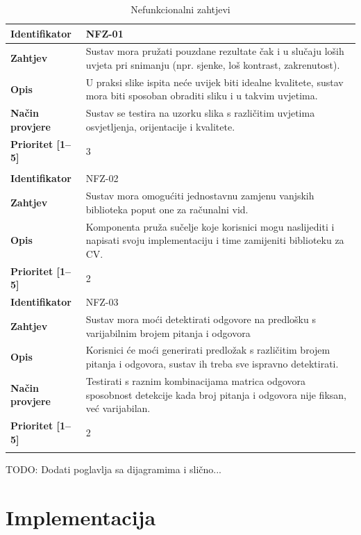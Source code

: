 \documentclass{foi}
\begin{document}
\begin{longtable}{|l|p{12cm}|}
    \hline
    \textbf{Identifikator} & NFZ-01 \\ \hline
    \textbf{Zahtjev} & Sustav mora pružati pouzdane rezultate čak i u slučaju loših uvjeta pri snimanju (npr. sjenke, loš kontrast, zakrenutost). \\ \hline
    \textbf{Opis} & U praksi slike ispita neće uvijek biti idealne kvalitete, sustav mora biti sposoban obraditi sliku i u takvim uvjetima. \\ \hline
    \textbf{Način provjere} & Sustav se testira na uzorku slika s različitim uvjetima osvjetljenja, orijentacije i kvalitete. \\ \hline
    \textbf{Prioritet [1--5]} & 3 \\ \hline
    \multicolumn{2}{|c|}{} \\ \hline

    \textbf{Identifikator} & NFZ-02 \\ \hline
    \textbf{Zahtjev} & Sustav mora omogućiti jednostavnu zamjenu vanjskih biblioteka poput one za računalni vid. \\ \hline
    \textbf{Opis} & Komponenta pruža sučelje koje korisnici mogu naslijediti i napisati svoju implementaciju i time zamijeniti biblioteku za CV. \\ \hline
    \textbf{Prioritet [1--5]} & 2 \\ \hline

    \pagebreak
    
    \hline
    \textbf{Identifikator} & NFZ-03  \\ \hline
    \textbf{Zahtjev} & Sustav mora moći detektirati odgovore na predlošku s varijabilnim brojem pitanja i odgovora \\ \hline
    \textbf{Opis} & Korisnici će moći generirati predložak s različitim brojem pitanja i odgovora, sustav ih treba sve ispravno detektirati. \\ \hline
    \textbf{Način provjere} & Testirati s raznim kombinacijama matrica odgovora sposobnost detekcije kada broj pitanja i odgovora nije fiksan, već varijabilan. \\ \hline
    \textbf{Prioritet [1--5]} & 2  \\ \hline
    
    \caption{Nefunkcionalni zahtjevi}
\end{longtable}
    
TODO: Dodati poglavlja sa dijagramima i slično...
\section{Implementacija}
\end{document}
